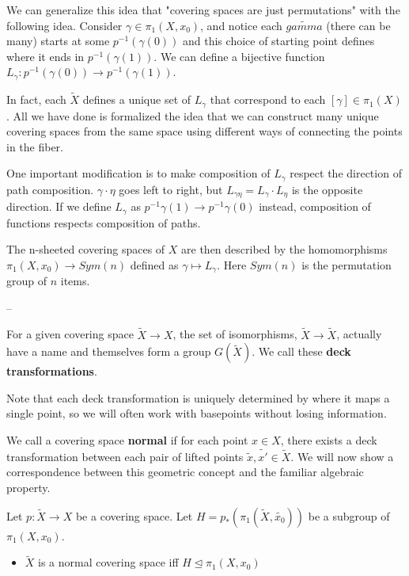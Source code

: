 \documentclass[10pt]{article}
\begin{document}
We can generalize this idea that "covering spaces are just permutations" with
the following idea. Consider $\gamma \in \pi_1(X, x_0)$, and notice each
$\tilde{gamma}$ (there can be many) starts at some $p^{-1}(\gamma(0))$ and this
choice of starting point defines where it ends in $p^{-1}(\gamma(1))$. We can
define a bijective function $L_{\gamma}: p^{-1}(\gamma(0)) \to p^{-1}(\gamma(1))$.

In fact, each $\tilde{X}$ defines a unique set of $L_{\gamma}$ that correspond
to each $[\gamma] \in \pi_1(X)$. All we have done is formalized the idea that
we can construct many unique covering spaces from the same space using
different ways of connecting the points in the fiber.

One important modification is to make composition of $L_{\gamma}$ respect the
direction of path composition. $\gamma \cdot \eta$ goes left to right, but
$L_{\gamma \eta} = L_{\gamma}\cdot L_{\eta}$ is the opposite direction. If we
define $L_{\gamma}$ as $p^{-1}{\gamma(1)} \to p^{-1}{\gamma(0)}$ instead,
composition of functions respects composition of paths.

The n-sheeted covering spaces of $X$ are then described by the homomorphisms
$\pi_1(X, x_0) \to Sym(n)$ defined as $\gamma \mapsto L_{\gamma}$. Here
$Sym(n)$ is the permutation group of $n$ items.

--

For a given covering space $\tilde{X} \to X$, the set of isomorphisms,
$\tilde{X} \to \tilde{X}$, actually have a name and themselves form a group
$G(\tilde{X})$. We call these \textbf{deck transformations}.

Note that each deck transformation is uniquely determined by where it maps a
single point, so we will often work with basepoints without losing information.

We call a covering space \textbf{normal} if for each point $x \in X$, there
exists a deck transformation between each pair of lifted points $\tilde{x},
\tilde{x'} \in \tilde{X}$. We will now show a correspondence between this
geometric concept and the familiar algebraic property.

\begin{definition}
	Let $p: \tilde{X} \to X$ be a covering space. Let $H = p_*(\pi_1(\tilde{X},
	\tilde{x_0}))$ be a subgroup of $\pi_1(X, x_0)$.
	\begin{itemize}
		\item{$\tilde{X}$ is a normal covering space iff $H \trianglelefteq \pi_1(X, x_0)$}
	\end{itemize}
\end{definition}
\end{document}
